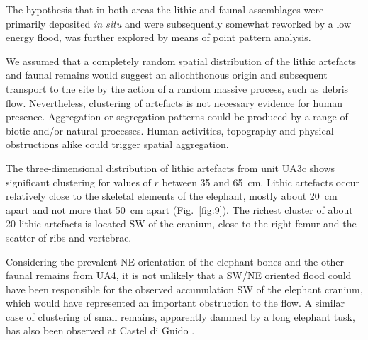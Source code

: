 \documentclass[review,authoryear,times]{elsarticle} %
\begin{document}


The hypothesis that in both areas the lithic and faunal assemblages were primarily deposited \emph{in situ} and were subsequently somewhat reworked by a low energy flood, was further explored by means of point pattern analysis.

We assumed that a completely random spatial distribution of the lithic artefacts and faunal remains would suggest an allochthonous origin and subsequent transport to the site by the action of a random massive process, such as debris flow. Nevertheless, clustering of artefacts is not necessary evidence for human presence. Aggregation or segregation patterns could be produced by a range of biotic and/or natural processes. Human activities, topography and physical obstructions alike could trigger spatial aggregation.


The three-dimensional distribution of lithic artefacts from unit UA3c shows significant clustering for values of $r$ between 35 and 65~cm. Lithic artefacts occur relatively close to the skeletal elements of the elephant, mostly about 20~cm apart and not more that 50~cm apart (Fig.~\ref{fig:9}). The richest cluster of about 20 lithic artefacts is located SW of the cranium, close to the right femur and the scatter of ribs and vertebrae.

Considering the prevalent NE orientation of the elephant bones and the other faunal remains from UA4, it is not unlikely that a SW/NE oriented flood could have been responsible for the observed accumulation SW of the elephant cranium, which would have represented an important obstruction to the flow. A similar case of clustering of small remains, apparently dammed by a long elephant tusk, has also been observed at Castel di Guido \citep{Boschian2010}.
\end{document}
